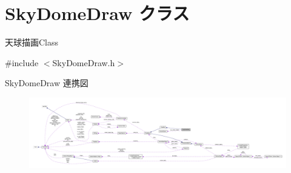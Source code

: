 \hypertarget{class_sky_dome_draw}{}\section{Sky\+Dome\+Draw クラス}
\label{class_sky_dome_draw}


天球描画\+Class  




{\ttfamily \#include $<$Sky\+Dome\+Draw.\+h$>$}



Sky\+Dome\+Draw 連携図\nopagebreak
\begin{figure}[H]
\begin{center}
\leavevmode
\includegraphics[width=350pt]{class_sky_dome_draw__coll__graph}
\end{center}
\end{figure}
